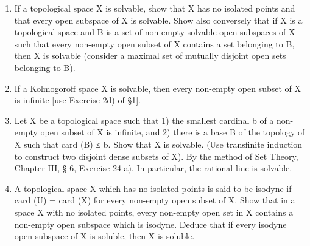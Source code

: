 \begin{enumerate}
\def\labelenumi{\alph{enumi})}
\item
  If a topological space X is solvable, show that X has no isolated points and that every open subspace of X is solvable. Show also conversely that if X is a topological space and B is a set of non-empty solvable open subspaces of X such that every non-empty open subset of X contains a set belonging to B, then X is solvable (consider a maximal set of mutually disjoint open sets belonging to B).
\item
  If a Kolmogoroff space X is solvable, then every non-empty open subset of X is infinite {[}use Exercise 2d) of §1{]}.
\item
  Let X be a topological space such that 1) the smallest cardinal b of a non-empty open subset of X is infinite, and 2) there is a base B of the topology of X such that card (B) ≤ b. Show that X is solvable. (Use transfinite induction to construct two disjoint dense subsets of X). By the method of Set Theory, Chapter III, § 6, Exercise 24 a). In particular, the rational line is solvable.
\item
  A topological space X which has no isolated points is said to be isodyne if card (U) = card (X) for every non-empty open subset of X. Show that in a space X with no isolated points, every non-empty open set in X contains a non-empty open subspace which is isodyne. Deduce that if every isodyne open subspace of X is soluble, then X is soluble.
\end{enumerate}

